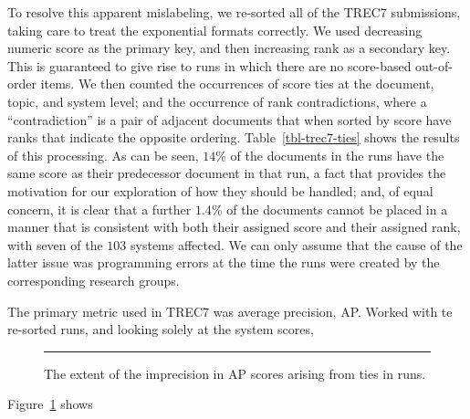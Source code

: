To resolve this apparent mislabeling, we re-sorted all of the TREC7
submissions, taking care to treat the exponential formats correctly.
We used decreasing numeric score as the primary key, and then
increasing rank as a secondary key.
This is guaranteed to give rise to runs in which there are no
score-based out-of-order items.
We then counted the occurrences of score ties at the document, topic,
and system level; and the occurrence of rank contradictions, where a
``contradiction'' is a pair of adjacent documents that when sorted by
score have ranks that indicate the opposite ordering.
Table~\ref{tbl-trec7-ties} shows the results of this processing.
As can be seen, $14$\% of the documents in the runs have the same
score as their predecessor document in that run, a fact that provides
the motivation for our exploration of how they should be handled;
and, of equal concern, it is clear that a further $1.4$\% of the
documents cannot be placed in a manner that is consistent with both
their assigned score and their assigned rank, with seven of the $103$
systems affected.
We can only assume that the cause of the latter issue was programming
errors at the time the runs were created by the corresponding
research groups.


The primary metric used in TREC7 was average precision, AP.
Worked with te re-sorted runs, and looking solely at the system
scores, {}

\begin{figure}[t!]
\centering
\rule{0.5mm}{40mm}
\caption{The extent of the imprecision in AP scores arising from ties
in runs.
{}
\label{fig-trec7-ap-scores}}
\end{figure}

Figure~\ref{fig-trec7-ap-scores} shows {}


{}
{}
